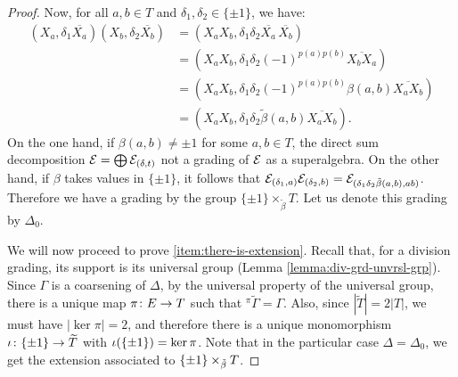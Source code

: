 \begin{proof}
    Now, for all $a, b \in T$ and $\delta_1, \delta_2 \in \{ \pm 1 \}$, we have:
    \begin{align*}
        (X_{a}, \delta_1 \overline{X_{a}})(X_{b}, \delta_2 \overline{X_{b}}) &= (X_{a} X_{b}, \delta_1 \delta_2 \overline{X_{a}} \,\overline{X_{b}}) \\
        &= (X_{a} X_{b}, \delta_1 \delta_2 (-1)^{p(a)p(b)} \overline{X_{b}X_{a}})\\ 
        &=(X_{a} X_{b}, \delta_1 \delta_2 (-1)^{p(a)p(b)} \beta(a, b) \overline{X_{a} X_{b}})\\
        &= (X_{a} X_{b}, \delta_1 \delta_2 \tilde\beta (a,b) \overline{X_{a} X_{b}}).
    \end{align*}
    On the one hand, if $\beta(a, b) \neq \pm 1$ for some $a,b \in T$, the direct sum decomposition $\mathcal E = \bigoplus \mathcal E_{(\delta, t)}$ not a grading of $\mathcal E$ as a superalgebra. 
    On the other hand, if $\beta$ takes values in $\{ \pm 1 \}$, it follows that $\mathcal E_{(\delta_1, a)} \mathcal E_{(\delta_2, b)} = \mathcal E_{(\delta_1 \delta_2 \tilde\beta (a,b), ab)}$. 
    Therefore we have a grading by the group $\{ \pm 1\} \times_{\tilde\beta} T$. 
    Let us denote this grading by $\Delta_0$. 
    
    We will now proceed to prove \eqref{item:there-is-extension}. 
    Recall that, for a division grading, its support is its universal group (Lemma \ref{lemma:div-grd-unvrsl-grp}). 
    Since $\Gamma$ is a coarsening of $\Delta$, by the universal property of the universal group, there is a unique map $\pi\colon E\to T$ such that ${}^{\pi}\widetilde \Gamma = \Gamma$. 
    Also, since $|\widetilde T| = 2 |T|$, we must have $|\ker \pi| = 2$, and therefore there is a unique monomorphism $\iota\colon \{ \pm 1 \} \to \widetilde T$ with $\iota(\{ \pm 1 \}) = \ker \pi$. 
    Note that in the particular case $\Delta = \Delta_0$, we get the extension associated to $\{ \pm 1 \} \times_{\tilde\beta} T$.
    

\end{proof}
